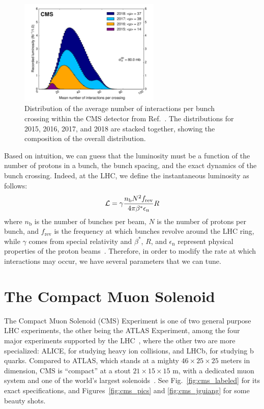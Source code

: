 \begin{figure}[!htb]
    \centering
    \includegraphics[width=0.6\textwidth]{fig/cms/pileup_run2.pdf}
    \caption[Distribution of the average number of interactions per bunch crossing within the CMS detector.]{
        Distribution of the average number of interactions per bunch crossing within the CMS detector from Ref.~\cite{CMSPublicLumi}. 
        The distributions for 2015, 2016, 2017, and 2018 are stacked together, showing the composition of the overall distribution.
    }
    \label{fig:pileup_run2}
\end{figure}

Based on intuition, we can guess that the luminosity must be a function of the number of protons in a bunch, the bunch spacing, and the exact dynamics of the bunch crossing. 
Indeed, at the LHC, we define the instantaneous luminosity as follows:
\begin{equation}
    \mathcal{L} = \gamma\frac{n_\mathrm{b}N^2f_\text{rev}}{4\pi\beta^{*}\epsilon_\mathrm{n}}R
\end{equation}
where $n_\mathrm{b}$ is the number of bunches per beam, $N$ is the number of protons per bunch, and $f_\text{rev}$ is the frequency at which bunches revolve around the LHC ring, while $\gamma$ comes from special relativity and $\beta^{*}$, $R$, and $\epsilon_\mathrm{n}$ represent physical properties of the proton beams~\cite{Aberle:2749422}. 
Therefore, in order to modify the rate at which interactions may occur, we have several parameters that we can tune.

\section{The Compact Muon Solenoid}\label{sec:cms}
The Compact Muon Solenoid (CMS) Experiment is one of two general purpose LHC experiments, the other being the ATLAS\footnotemark{} Experiment, among the four major experiments supported by the LHC~\cite{LHCWeb}, where the other two are more specialized: ALICE, for studying heavy ion collisions, and LHCb, for studying b quarks. 
Compared to ATLAS, which stands at a mighty $46\times25\times25$ meters in dimension, CMS is ``compact'' at a stout $21\times15\times15$ m, with a dedicated muon system and one of the world's largest solenoids~\cite{ATLASWeb, CMSWeb}. 
See Fig.~\ref{fig:cms_labeled} for its exact specifications, and Figures~\ref{fig:cms_pics} and \ref{fig:cms_jguiang} for some beauty shots. 

